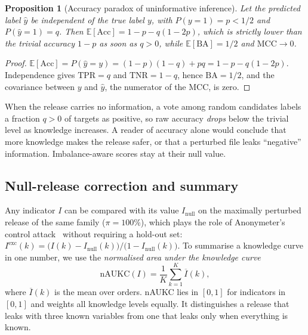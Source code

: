 \documentclass[preprint,12pt]{elsarticle}
\newtheorem{proposition}{Proposition}
\begin{document}
\begin{proposition}[Accuracy paradox of uninformative inference]
\label{prop:accuracy}
Let the predicted label $\hat y$ be independent of the true label $y$, with $P(y=1)=p<1/2$ and $P(\hat y=1)=q$. Then $\mathbb{E}[\mathrm{Acc}]=1-p-q(1-2p)$, which is strictly lower than the trivial accuracy $1-p$ as soon as $q>0$, while $\mathbb{E}[\mathrm{BA}]=1/2$ and $\mathrm{MCC}\to 0$.
\end{proposition}
\begin{proof}
$\mathbb{E}[\mathrm{Acc}]=P(\hat y=y)=(1-p)(1-q)+pq=1-p-q(1-2p)$. Independence gives $\mathrm{TPR}=q$ and $\mathrm{TNR}=1-q$, hence $\mathrm{BA}=1/2$, and the covariance between $y$ and $\hat y$, the numerator of the MCC, is zero.
\end{proof}
When the release carries no information, a vote among random candidates labels a fraction $q>0$ of targets as positive, so raw accuracy \emph{drops} below the trivial level as knowledge increases. A reader of accuracy alone would conclude that more knowledge makes the release safer, or that a perturbed file leaks ``negative'' information. Imbalance-aware scores stay at their null value.

\subsection{Null-release correction and summary}
Any indicator $I$ can be compared with its value $I_\text{null}$ on the maximally perturbed release of the same family ($\pi=100\%$), which plays the role of Anonymeter's control attack~\cite{giomi2023anonymeter} without requiring a hold-out set:
$I^{\text{exc}}(k)=\bigl(I(k)-I_\text{null}(k)\bigr)/\bigl(1-I_\text{null}(k)\bigr)$.
To summarise a knowledge curve in one number, we use the \emph{normalised area under the knowledge curve}
\begin{equation}
\mathrm{nAUKC}(I)=\frac{1}{K}\sum_{k=1}^{K} \overline{I}(k),
\end{equation}
where $\overline{I}(k)$ is the mean over orders. nAUKC lies in $[0,1]$ for indicators in $[0,1]$ and weights all knowledge levels equally. It distinguishes a release that leaks with three known variables from one that leaks only when everything is known.
\end{document}
